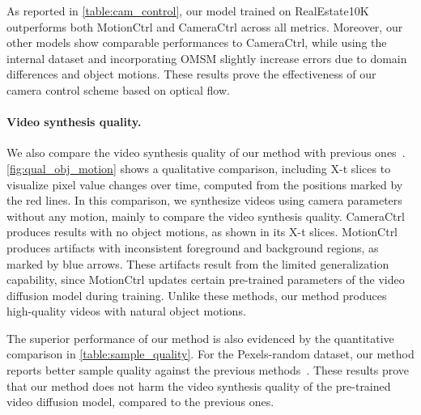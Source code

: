 As reported in \cref{table:cam_control}, our model trained on RealEstate10K~\cite{zhou2018stereo} outperforms both MotionCtrl and CameraCtrl across all metrics.
Moreover, our other models show comparable performances to CameraCtrl, while using the internal dataset and incorporating OMSM slightly increase errors due to domain differences and object motions.
These results prove the effectiveness of our camera control scheme based on optical flow.









\vspace{-4.5mm}
\paragraph{Video synthesis quality.}
We also compare the video synthesis quality of our method with previous ones~\cite{he2024cameractrl,wang2024motionctrl}.
\cref{fig:qual_obj_motion} shows a qualitative comparison, including X-t slices to visualize pixel value changes over time, computed from the positions marked by the red lines.
In this comparison, we synthesize videos using camera parameters without any motion, mainly to compare the video synthesis quality.
CameraCtrl~\cite{he2024cameractrl} produces results with no object motions, as shown in its X-t slices.
MotionCtrl~\cite{wang2024motionctrl} produces artifacts with inconsistent foreground and background regions, as marked by blue arrows.
These artifacts result from the limited generalization capability, since MotionCtrl updates certain pre-trained parameters of the video diffusion model during training.
Unlike these methods, our method produces high-quality videos with natural object motions.

The superior performance of our method is also evidenced by the quantitative comparison in \cref{table:sample_quality}.
For the Pexels-random dataset, our method reports better sample quality against the previous methods~\cite{he2024cameractrl,wang2024motionctrl}.
These results prove that our method does not harm the video synthesis quality of the pre-trained video diffusion model, compared to the previous ones.

